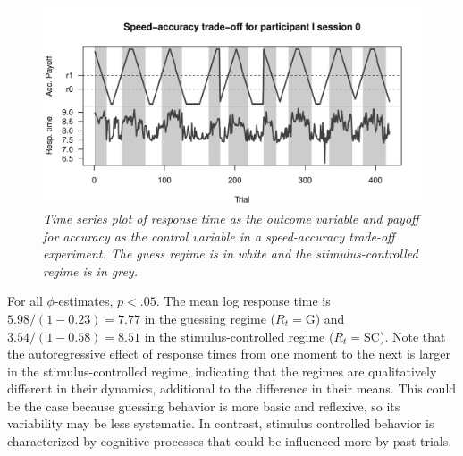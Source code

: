 \documentclass{article}
\begin{document}
\begin{figure}
\begin{center}
\includegraphics[scale=.5]{ts_plot_SAT}
\caption{\textit{Time series plot of response time as the outcome variable and payoff for accuracy as the control variable in a speed-accuracy trade-off experiment. The guess regime is in white and the stimulus-controlled regime is in grey.}}
\label{fig:ts_plot_SAT}
\end{center}
\end{figure}

For all $\phi$-estimates, $p < .05$. 
The mean log response time is $5.98/(1 - 0.23) = 7.77$ in the guessing regime ($R_t = \mathrm{G}$) and $3.54/(1 - 0.58) = 8.51$ in the stimulus-controlled regime ($R_t = \mathrm{SC}$). 
Note that the autoregressive effect of response times from one moment to the next is larger in the stimulus-controlled regime, indicating that the regimes are qualitatively different in their dynamics, additional to the difference in their means. This could be the case because guessing behavior is more basic and reflexive, so its variability may be less systematic. In contrast, stimulus controlled behavior is characterized by cognitive processes that could be influenced more by past trials.
\end{document}
